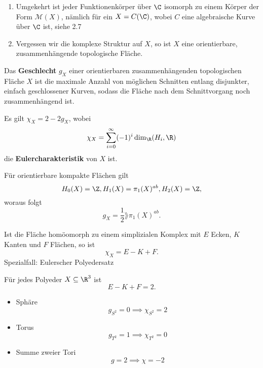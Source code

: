 \begin{bemerkungnr}
    \begin{enumerate}[label=\alph*.)]
        \item Umgekehrt ist jeder Funktionenkörper über $\C$ isomorph zu einem Körper der Form $\mathcal{M}(X)$,
        nämlich für ein $X = C(\C)$, wobei $C$ eine algebraische Kurve über $\C$ ist, siehe 2.7
        \item Vergessen wir die komplexe Struktur auf $X$, so ist $X$ eine orientierbare, zusammenhängende topologische Fläche.
    \end{enumerate}
\end{bemerkungnr}

\begin{definition}
    Das \textbf{Geschlecht} $g_X$ einer orientierbaren zusammenhängenden topologischen Fläche $X$ ist die maximale Anzahl von
    möglichen Schnitten entlang disjunkter, einfach geschlossener Kurven, sodass die Fläche nach dem Schnittvorgang noch zusammenhängend ist.
\end{definition}

\begin{bemerkungnr}
    Es gilt $\chi_X = 2 - 2g_X$, wobei
    $$ \chi_X = \sum\limits_{i=0}^\infty (-1)^i \dim_\R (H_i, \R)$$
    die \textbf{Eulercharakteristik} von $X$ ist.

    Für orientierbare kompakte Flächen gilt 
    $$H_0(X) = \Z, H_1(X) = \pi_1(X)^{ab}, H_2(X) = \Z,$$
    woraus folgt
    $$ g_X = \frac{1}{2} \rang \pi_1(X)^{ab}.$$
\end{bemerkungnr}

\begin{beispiel}
    Ist die Fläche homöomorph zu einem simplizialen Komplex mit $E$ Ecken, $K$ Kanten und $F$ Flächen,
    so ist
    $$ \chi_X = E - K + F.$$
    Spezialfall: Eulerscher Polyedersatz

    Für jedes Polyeder $X \subseteq \R^3$ ist 
    $$ E - K + F = 2.$$
\end{beispiel}

\begin{beispiel}
    \begin{itemize}
        \item Sphäre
        $$g_{S^2} = 0 \implies \chi_{S^2} = 2 $$

        \item Torus
        $$g_{T^2} = 1 \implies \chi_{T^2} = 0 $$

        \item Summe zweier Tori
        $$ g = 2 \implies \chi = -2$$
    \end{itemize}
\end{beispiel}

